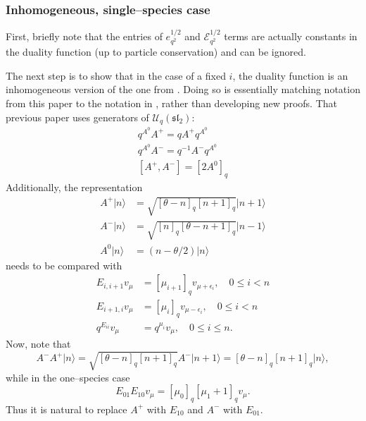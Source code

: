 \documentclass{ximera}
\begin{document}
\subsubsection{Inhomogeneous, single--species case}
First, briefly note that the entries of $e_{q^2}^{1/2}$ and $\mathcal{E}_{q^2}^{1/2}$ terms are actually constants in the duality function  (up to particle conservation) and can be ignored.




The next step is to show that in the case of a fixed $i$, the duality function is an inhomogeneous version of the one from \cite{CFG21}.  Doing so is essentially matching notation from this paper to the notation in \cite{CFG21}, rather than developing new proofs. That previous paper \cite{CFG21} uses generators of $\mathcal{U}_q(\mathfrak{sl}_2)$:
$$
\begin{array}{l}q^{A^{0}} A^{+}=q A^{+} q^{A^{0}} \\ q^{A^{0}} A^{-}=q^{-1} A^{-} q^{A^{0}} \\ {\left[A^{+}, A^{-}\right]=\left[2 A^{0}\right]_{q}}\end{array}
$$
Additionally, the representation
 $$
\begin{aligned} A^{+}\vert n\rangle &=\sqrt{[\theta-n]_{q}[n+1]_{q}}\vert n+1\rangle \\ A^{-}\vert n\rangle &=\sqrt{[n]_{q}[\theta-n+1]_{q}}\vert n-1\rangle \\ A^{0}\vert n\rangle &=(n-\theta / 2)\vert n\rangle \end{aligned}
$$
needs to be compared with
\begin{align*}
E_{i,i+1} v_{\mu} &= [\mu_{i+1}]_q v_{ \mu + \epsilon_i}, \quad 0 \leq i < n \\
E_{i+1,i}v_{\mu}  &= [\mu_{i}]_q v_{\mu - \epsilon_i} ,\quad 0 \leq i < n \\
q^{E_{ii}} v_{\mu} &= q^{\mu_i} v_{\mu},\quad 0 \leq i \leq n.
\end{align*}
Now, note that
$$
A^-A^+ \vert n \rangle = \sqrt{[\theta-n]_{q}[n+1]_{q}} A^- \vert n+1\rangle = {[\theta-n]_{q}[n+1]_{q}} \vert n\rangle,
$$
while in the one--species case
$$
E_{01}E_{10} v_{\mu} = [\mu_0]_q [\mu_1+1]_q v_{\mu}.
$$
Thus it is natural to replace $A^+$ with $E_{10}$ and $A^-$ with $E_{01}$.
\end{document}
